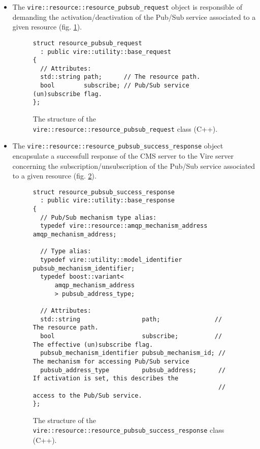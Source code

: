 \begin{itemize}

\item  The \texttt{vire::resource::resource\_pubsub\_request} object is responsible of
  demanding the activation/deactivation of the Pub/Sub service associated to a given
  resource (fig. \ref{fig-app-payload-resource_pubsub_request}).

\begin{figure}[h]
\vskip 10pt
\small
\begin{Verbatim}[frame=single,xleftmargin=0.cm,label=\fbox{C++}]
struct resource_pubsub_request
  : public vire::utility::base_request
{
  // Attributes:
  std::string path;      // The resource path.
  bool        subscribe; // Pub/Sub service (un)subscribe flag.
};
\end{Verbatim}
\normalsize
\caption{The structure of the \texttt{vire::resource::resource\_pubsub\_request}
  class (C++).}
\label{fig-app-payload-resource_pubsub_request}
\end{figure}

\item The \texttt{vire::resource::resource\_pubsub\_success\_response}
  object encapsulate a  successfull response of the CMS  server to the
  Vire  server  concerning   the  subscription/unsubscription  of  the
  Pub/Sub     service    associated     to     a    given     resource
  (fig. \ref{fig-app-payload-resource_pubsub_success_response}).

\begin{figure}[h]
\vskip 10pt
\small
\begin{Verbatim}[frame=single,xleftmargin=0.cm,label=\fbox{C++}]
struct resource_pubsub_success_response
  : public vire::utility::base_response
{
  // Pub/Sub mechanism type alias:
  typedef vire::resource::amqp_mechanism_address amqp_mechanism_address;

  // Type alias:
  typedef vire::utility::model_identifier pubsub_mechanism_identifier;
  typedef boost::variant<
      amqp_mechanism_address
      > pubsub_address_type;

  // Attributes:
  std::string                 path;               // The resource path.
  bool                        subscribe;          // The effective (un)subscribe flag.
  pubsub_mechanism_identifier pubsub_mechanism_id; // The mechanism for accessing Pub/Sub service
  pubsub_address_type         pubsub_address;      // If activation is set, this describes the
                                                   // access to the Pub/Sub service.
};
\end{Verbatim}
\normalsize
\caption{The structure of the \texttt{vire::resource::resource\_pubsub\_success\_response}
  class (C++).}
\label{fig-app-payload-resource_pubsub_success_response}
\end{figure}


\end{itemize}
